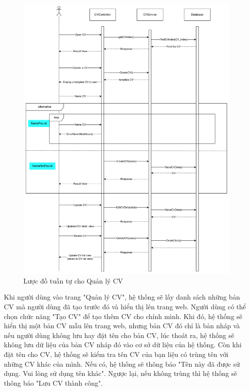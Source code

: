 \begin{figure}[H]

	\centering
    \includegraphics[scale = 0.1]{img/CV_Management_sequenceDiagram.png}
    \caption{Lược đồ tuần tự cho Quản lý CV}
	
\end{figure}

Khi người dùng vào trang "Quản lý CV", hệ thống sẽ lấy danh sách những bản CV mà người dùng đã tạo trước đó và hiển thị lên trang web. Người dùng có thể chọn chức năng "Tạo CV" để tạo thêm CV cho chính mình. Khi đó, hệ thống sẽ hiển thị một bản CV mẫu lên trang web, nhưng bản CV đó chỉ là bản nháp và nếu người dùng không lưu hay đặt tên cho bản CV, lúc thoát ra, hệ thống sẽ không lưu dữ liệu của bản CV nháp đó vào cơ sở dữ liệu của hệ thống. Còn khi đặt tên cho CV, hệ thống sẽ kiểm tra tên CV của bạn liệu có trùng tên với những CV khác của mình. Nếu có, hệ thống sẽ thông báo "Tên này đã được sử dụng. Vui lòng sử dụng tên khác". Ngược lại, nếu không trùng thì hệ thống sẽ thông báo "Lưu CV thành công".


